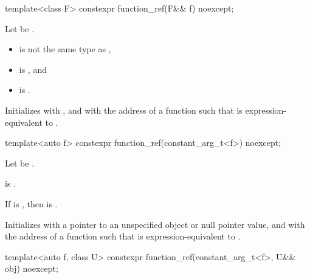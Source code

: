 %
\begin{itemdecl}
template<class F> constexpr function_ref(F&& f) noexcept;
\end{itemdecl}

\begin{itemdescr}
\pnum
Let  be .

\pnum
\constraints
\begin{itemize}
\item {} is not the same type as ,
\item {} is , and
\item {} is .
\end{itemize}

\pnum
\effects
Initializes
 with , and
 with the address of a function 
such that
is expression-equivalent to
.
\end{itemdescr}

%
\begin{itemdecl}
template<auto f> constexpr function_ref(constant_arg_t<f>) noexcept;
\end{itemdecl}

\begin{itemdescr}
\pnum
Let  be .

\pnum
\constraints
{} is .

\pnum
\mandates
If  is ,
then  is .

\pnum
\effects
Initializes
 with a pointer to an unspecified object or
null pointer value, and
 with the address of a function 
such that
is expression-equivalent to
.
\end{itemdescr}

%
\begin{itemdecl}
template<auto f, class U>
  constexpr function_ref(constant_arg_t<f>, U&& obj) noexcept;
\end{itemdecl}

